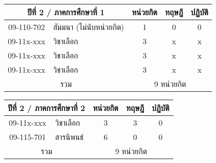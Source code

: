 \vspace{5ex}\par\noindent
\renewcommand{\arraystretch}{1.4}
\begin{tabular}{|cp{}|ccc|}
\hline
\multicolumn{2}{|c|}{ปีที่ 2 / ภาคการศึกษาที่ 1} & \multicolumn{1}{c|}{หน่วยกิต} & \multicolumn{1}{c|}{ทฤษฎี} & \multicolumn{1}{c|}{ปฏิบัติ}  \\ \hline
\multicolumn{1}{|c|}{09-110-702}  & สัมมนา (ไม่นับหน่วยกิต) & \multicolumn{1}{c|}{1}        & \multicolumn{1}{c|}{0}     & \multicolumn{1}{c|}{0}                    \\ \hline
\multicolumn{1}{|c|}{09-11x-xxx}  & วิชาเลือก  & \multicolumn{1}{c|}{3}        & \multicolumn{1}{c|}{x}     & \multicolumn{1}{c|}{x}                    \\ \hline
\multicolumn{1}{|c|}{09-11x-xxx}  & วิชาเลือก  & \multicolumn{1}{c|}{3}        & \multicolumn{1}{c|}{x}     & \multicolumn{1}{c|}{x}                    \\ \hline
\multicolumn{1}{|c|}{09-11x-xxx}  & วิชาเลือก & \multicolumn{1}{c|}{3}        & \multicolumn{1}{c|}{x}     & \multicolumn{1}{c|}{x}                    \\ \hline
\multicolumn{2}{|c|}{รวม}                        & \multicolumn{3}{c|}{9 หน่วยกิต}                                                                            \\ \hline
\end{tabular}

\vspace{5ex}\par\noindent
\renewcommand{\arraystretch}{1.4}
\begin{tabular}{|cp{}|ccc|}
\hline
\multicolumn{2}{|c|}{ปีที่ 2 / ภาคการศึกษาที่ 2} & \multicolumn{1}{c|}{หน่วยกิต} & \multicolumn{1}{c|}{ทฤษฎี} & \multicolumn{1}{c|}{ปฏิบัติ}  \\ \hline
\multicolumn{1}{|c|}{09-11x-xxx}  & วิชาเลือก  & \multicolumn{1}{c|}{3}        & \multicolumn{1}{c|}{3}     & \multicolumn{1}{c|}{0}                    \\ \hline
\multicolumn{1}{|c|}{09-115-701}  & สารนิพนธ์ & \multicolumn{1}{c|}{6}        & \multicolumn{1}{c|}{0}     & \multicolumn{1}{c|}{0}                    \\ \hline
\multicolumn{2}{|c|}{รวม}                        & \multicolumn{3}{c|}{9 หน่วยกิต}                                                                            \\ \hline
\end{tabular}


